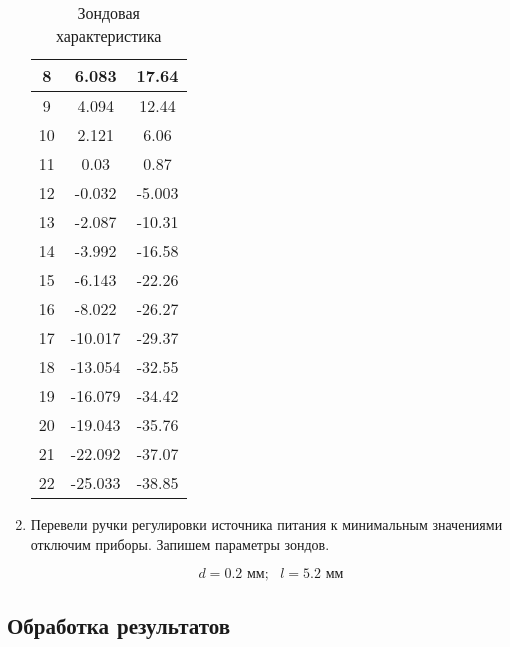 \documentclass[a4paper,12pt]{article} %
\begin{document}
\begin{enumerate}
\begin{table}[h]
\begin{tabular}{|c|c|c|}
            8 & 6.083 & 17.64 \\ \hline
            9 & 4.094 & 12.44 \\ \hline
            10 & 2.121 & 6.06 \\ \hline
            11 & 0.03 & 0.87 \\ \hline
            12 & -0.032 & -5.003 \\ \hline
            13 & -2.087 & -10.31 \\ \hline
            14 & -3.992 & -16.58 \\ \hline
            15 & -6.143 & -22.26 \\ \hline
            16 & -8.022 & -26.27 \\ \hline
            17 & -10.017 & -29.37 \\ \hline
            18 & -13.054 & -32.55 \\ \hline
            19 & -16.079 & -34.42 \\ \hline
            20 & -19.043 & -35.76 \\ \hline
            21 & -22.092 & -37.07 \\ \hline
            22 & -25.033 & -38.85 \\ \hline
	\end{tabular}
	\caption{Зондовая характеристика}
	\label{tab2}
    \end{table}
    
    \item Перевели ручки регулировки источника питания к минимальным значениями отключим приборы. Запишем параметры зондов.

    \[ d = 0.2 \text{ мм}; \text{ } l = 5.2 \text{ мм} \]
\end{enumerate}

\newpage

\subsection{Обработка результатов}
\end{document}
